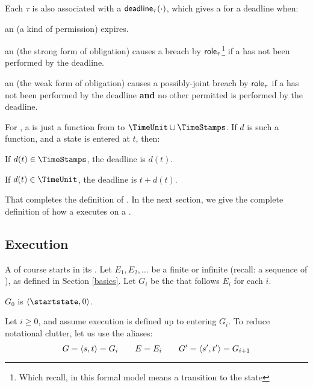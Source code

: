 \documentclass[12pt]{article}
\begin{document}
Each \transition $\tau$ is also associated with a  $\textsf{deadline}_{\tau}(\cdot)$, which gives a \TimeStamp for a deadline when: 
	\begin{LPPI}
	\item an \enabled \mayntran (a kind of permission) expires.
	\item an \enabled \mustntran (the strong form of obligation) causes a breach by $\textsf{role}_{\tau}$\footnote{Which recall, in this formal model means a transition to the state \breached{\{\role{\tau}\}}} if a \compatible \Event has not been performed by the deadline. 
	\item an \enabled \rmustntran (the weak form of obligation) causes a possibly-joint breach by $\textsf{role}_{\tau}$ if a \compatible \Event has not been performed by the deadline {\bf and} no other permitted \Event is performed by the deadline. 
	\end{LPPI}
For \FSContracts, a \DeadlineFn is just a function from \TimeStamps to $\TimeUnit \cup \TimeStamps$. If $d$ is such a function, and a state is entered at \TimeStamp $t$, then:
\begin{LPPI}
\item If $d(t) \in \TimeStamps$, the deadline is $d(t)$.
	\item If $d(t) \in \TimeUnit$, the deadline is $t + d(t)$.
\end{LPPI}

That completes the definition of \FSContract. In the next section, we give the complete definition of how a \FSContract executes on a \trace.

\subsection{Execution}
A \FSContract of course starts in its \startstate. Let $E_1, E_2, \dots$ be a finite or infinite \trace (recall: a sequence of \Events), as defined in Section \ref{basics}. Let $G_i$ be the \GlobalState that follows $E_i$ for each $i$.

$G_0$ is $\tup{\startstate, 0}$.  

Let $i \geq 0$, and assume execution is defined up to entering $G_i$. To reduce notational clutter, let us use the aliases:
\[ G = \langle s,t\rangle = G_i  \qquad E = E_i \qquad  G' = \langle s',t'\rangle = G_{i+1} \]
\end{document}
